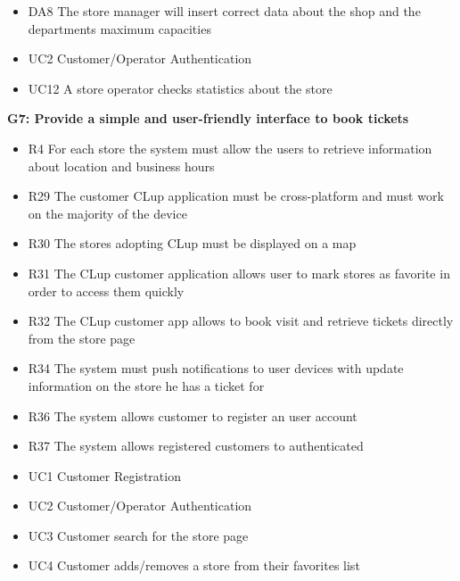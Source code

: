 \begin{itemize}[label=\textcolor{clup_red}{\textbullet}]
    \item DA8 The store manager will insert correct data about the shop and the departments maximum capacities
\end{itemize}
\begin{itemize}[label=\textcolor{clup_yellow}{\textbullet}]
    \item UC2 Customer/Operator Authentication
    \item UC12 A store operator checks statistics about the store
\end{itemize}

\vfill
\pagebreak

\textbf{G7: Provide a simple and user-friendly interface to book tickets}
\begin{itemize}[label=\textcolor{clup_blue2}{\textbullet}]
    \item R4 For each store the system must allow the users to retrieve information about location and business hours
    \item R29 The customer CLup application must be cross-platform and must work on the majority of the device
    \item R30 The stores adopting CLup must be displayed on a map
    \item R31 The CLup customer application allows user to mark stores as favorite in order to access them quickly
    \item R32 The CLup customer app allows to book visit and retrieve tickets directly from the store page
    \item R34 The system must push notifications to user devices with update information on the store he has a ticket for
    \item R36 The system allows customer to register an user account
    \item R37 The system allows registered customers to authenticated
\end{itemize}
\begin{itemize}[label=\textcolor{clup_yellow}{\textbullet}]
    \item UC1 Customer Registration
    \item UC2 Customer/Operator Authentication
    \item UC3 Customer search for the store page
    \item UC4 Customer adds/removes a store from their favorites list
\end{itemize}

